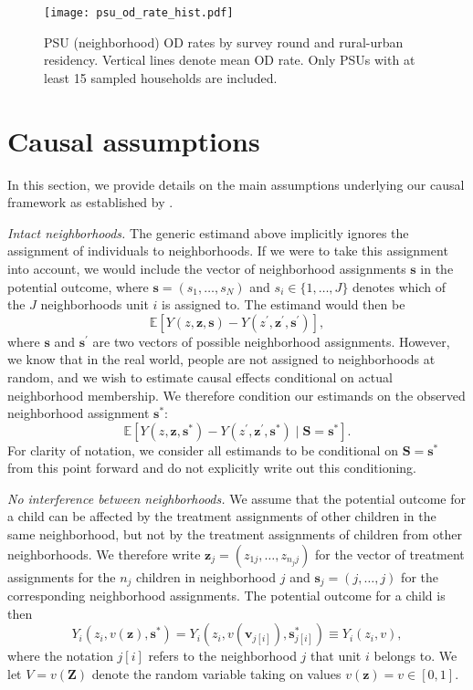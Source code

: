 \documentclass[12pt,a4paper,titlepage]{article}
\begin{document}
\begin{appendices}
\begin{figure}[h!]\label{fig:psu_od_dist}
	\centering
	\texttt{[image: psu\_od\_rate\_hist.pdf]}
	\caption{PSU (neighborhood) OD rates by survey round and rural-urban residency. Vertical lines denote mean OD rate. Only PSUs with at least 15 sampled households are included.}
\end{figure}


\section{Causal assumptions}\label{sec:assumptions}
In this section, we provide details on the main assumptions underlying our causal framework as established by \cite{hong_raudenbush}.
	
\textit{Intact neighborhoods.} The generic estimand above implicitly ignores the assignment of individuals to neighborhoods. If we were to take this assignment into account, we would include the vector of neighborhood assignments $\mathbf{s}$ in the potential outcome, where $\mathbf{s} = (s_1, \ldots, s_N)$ and $s_i \in \{1, \ldots, J\}$ denotes which of the $J$ neighborhoods unit $i$ is assigned to. The estimand would then be
\[
	\mathbb{E}[Y(z, \mathbf{z}, \mathbf{s}) - Y(z^{\prime}, \mathbf{z}^{\prime}, \mathbf{s}^{\prime})],
\]
where $\mathbf{s}$ and $\mathbf{s}^{\prime}$ are two vectors of possible neighborhood assignments. However, we know that in the real world, people are not assigned to neighborhoods at random, and we wish to estimate causal effects conditional on actual neighborhood membership. We therefore condition our estimands on the observed neighborhood assignment $\mathbf{s}^*$:
\[
	\mathbb{E}[Y(z, \mathbf{z}, \mathbf{s}^*) - Y(z^{\prime}, \mathbf{z}^{\prime}, \mathbf{s}^*) \mid \mathbf{S} = \mathbf{s}^*].
\]
For clarity of notation, we consider all estimands to be conditional on $\mathbf{S} = \mathbf{s}^*$ from this point forward and do not explicitly write out this conditioning.

\textit{No interference between neighborhoods.} We assume that the potential outcome for a child can be affected by the treatment assignments of other children in the same neighborhood, but not by the treatment assignments of children from other neighborhoods. We therefore write $\mathbf{z}_j = (z_{1j}, \ldots, z_{n_j j})$ for the vector of treatment assignments for the $n_j$ children in neighborhood $j$ and $\mathbf{s}_j = (j, \ldots, j)$ for the corresponding neighborhood assignments. The potential outcome for a child is then
\[
	Y_i(z_i, v(\mathbf{z}), \mathbf{s}^*) = Y_i(z_i, v(\mathbf{v}_{j[i]}), \mathbf{s}_{j[i]}^*) \equiv Y_i(z_i, v),
\]
where the notation $j[i]$ refers to the neighborhood $j$ that unit $i$ belongs to. We let $V = v(\mathbf{Z})$ denote the random variable taking on values $v(\mathbf{z}) = v \in [0, 1]$.


\end{appendices}
\end{document}
